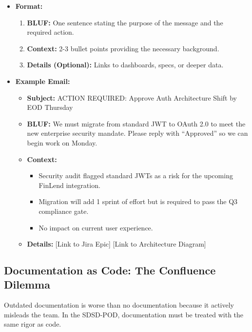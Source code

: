 \documentclass[
  11pt,
  openany,
  oneside]{book}
\providecommand{\tightlist}{%
  \setlength{\itemsep}{0pt}\setlength{\parskip}{0pt}}
\begin{document}
\begin{itemize}
\tightlist
\item
  \textbf{Format:}

  \begin{enumerate}
  \def\labelenumi{\arabic{enumi}.}
  \tightlist
  \item
    \textbf{BLUF:} One sentence stating the purpose of the message and
    the required action.
  \item
    \textbf{Context:} 2-3 bullet points providing the necessary
    background.
  \item
    \textbf{Details (Optional):} Links to dashboards, specs, or deeper
    data.
  \end{enumerate}
\item
  \textbf{Example Email:}

  \begin{itemize}
  \tightlist
  \item
    \textbf{Subject:} ACTION REQUIRED: Approve Auth Architecture Shift
    by EOD Thursday
  \item
    \textbf{BLUF:} We must migrate from standard JWT to OAuth 2.0 to
    meet the new enterprise security mandate. Please reply with
    ``Approved'' so we can begin work on Monday.
  \item
    \textbf{Context:}

    \begin{itemize}
    \tightlist
    \item
      Security audit flagged standard JWTs as a risk for the upcoming
      FinLend integration.
    \item
      Migration will add 1 sprint of effort but is required to pass the
      Q3 compliance gate.
    \item
      No impact on current user experience.
    \end{itemize}
  \item
    \textbf{Details:} {[}Link to Jira Epic{]} {[}Link to Architecture
    Diagram{]}
  \end{itemize}
\end{itemize}

\subsection{Documentation as Code: The Confluence
Dilemma}\label{documentation-as-code-the-confluence-dilemma}

Outdated documentation is worse than no documentation because it
actively misleads the team. In the SDSD-POD, documentation must be
treated with the same rigor as code.
\end{document}
